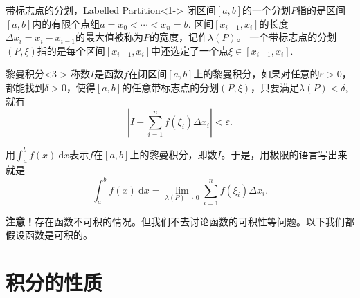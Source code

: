 \begin{frame}

\begin{block}{带标志点的分划，Labelled Partition}<1->
闭区间$[a,b]$的一个分划$P$指的是区间$[a,b]$内的有限个点组$a=x_0<\cdots<x_n=b.$ 区间$[x_{i-1},x_i]$的长度$\Delta x_i = x_i-x_{i-1}$的最大值被称为$P$的宽度，记作$\lambda(P)$。\newline\pause
一个带标志点的分划$(P,\xi)$指的是每个区间$[x_{i-1},x_i]$中还选定了一个点$\xi\in[x_{i-1},x_i].$
\end{block}

\begin{block}{黎曼积分}<3->
称数$I$是函数$f$在闭区间$[a,b]$上的黎曼积分，如果对任意的$\varepsilon > 0$，都能找到$\delta > 0$，使得$[a,b]$的任意带标志点的分划$(P,\xi)$，只要满足$\lambda(P) < \delta,$ 就有
\[\left| I - \sum\limits_{i=1}^n f(\xi_i)\Delta x_i \right| < \varepsilon.\]
\end{block}

\end{frame}


\begin{frame}

用$\int_a^b f(x) ~ \mathrm{d}x$表示$f$在$[a,b]$上的黎曼积分，即数$I$。于是，用极限的语言写出来就是
\[\int_a^b f(x) ~ \mathrm{d}x = \lim\limits_{\lambda(P) \to 0} \sum\limits_{i=1}^n f(\xi_i)\Delta x_i.\]

\vspace{2em}
\pause

{\bfseries 注意！}存在函数不可积的情况。但我们不去讨论函数的可积性等问题。以下我们都假设函数是可积的。

\end{frame}


\section{积分的性质}


